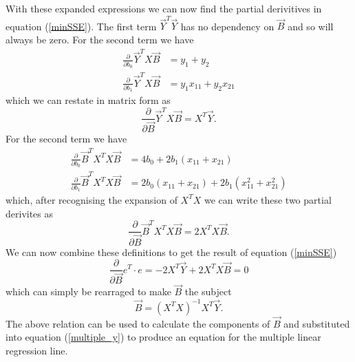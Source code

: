 \documentclass[12pt,a4paper]{report}
\begin{document}
		With these expanded expressions we can now find the partial derivitives in equation (\ref{minSSE}). The first term $\vec{Y}^{T}\vec{Y}$ has no  dependency on $\vec{B}$ and so will always be zero. For the second term we have
		\begin{align}
			\frac{\partial}{\partial b_{0}} \vec{Y}^{T}X\vec{B} &= y_{1} + y_{2}\\
			\frac{\partial}{\partial b_{1}} \vec{Y}^{T}X\vec{B} &= y_{1}x_{11} + y_{2}x_{21}
		\end{align}
		which we can restate in matrix form as 
		\begin{equation}
			\frac{\partial}{\partial \vec{B}} \vec{Y}^{T}X\vec{B} = X^{T}\vec{Y}.
		\end{equation}
		For the second term we have
		\begin{align}
			\frac{\partial}{\partial b_{0}} \vec{B}^{T}X^{T}X\vec{B} &= 4b_{0}+2b_{1}\left(x_{11}+x_{21}\right)\\
			\frac{\partial}{\partial b_{1}} \vec{B}^{T}X^{T}X\vec{B} &= 2b_{0}\left(x_{11}+x_{21}\right) + 2b_{1}\left(x_{11}^{2}+x_{21}^{2}\right)
		\end{align}
		which, after recognising the expansion of $X^{T}X$ we can write these two partial derivites as 
		\begin{equation}
			\frac{\partial}{\partial \vec{B}} \vec{B}^{T}X^{T}X\vec{B} = 2X^{T}X\vec{B}.
		\end{equation} 
		We can now combine these definitions to get the result of equation (\ref{minSSE})
		\begin{equation}
		\frac{\partial}{\partial\vec{B}} e^{T}\cdot e = -2X^{T}\vec{Y} + 2X^{T}X\vec{B} = 0
		\end{equation}
		which can simply be rearraged to make $\vec{B}$ the subject
		\begin{equation}
			\vec{B} = \left(X^{T}X\right)^{-1}X^{T}\vec{Y}.
		\end{equation}
		The above relation can be used to calculate the components of $\vec{B}$ and substituted into equation (\ref{multiple_y}) to produce an equation for the multiple linear regression line.
\end{document}
